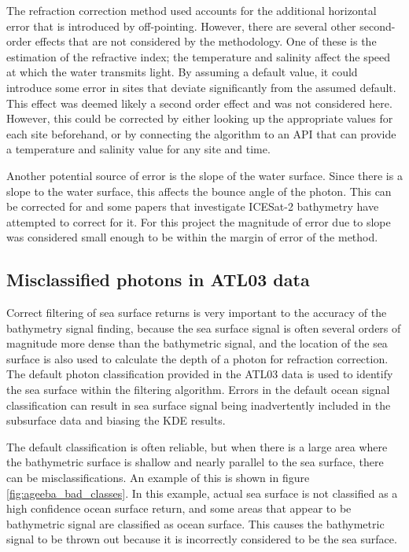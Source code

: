 The refraction correction method used accounts for the additional horizontal error that is introduced by off-pointing. However, there are several other second-order effects that are not considered by the methodology. One of these is the estimation of the refractive index; the temperature and salinity affect the speed at which the water transmits light. By assuming a default value, it could introduce some error in sites that deviate significantly from the assumed default. This effect was deemed likely a second order effect and was not considered here. However, this could be corrected by either looking up the appropriate values for each site beforehand, or by connecting the algorithm to an API that can provide a temperature and salinity value for any site and time.

Another potential source of error is the slope of the water surface. Since there is a slope to the water surface, this affects the bounce angle of the photon. This can be corrected for and some papers that investigate ICESat-2 bathymetry have attempted to correct for it. For this project the magnitude of error due to slope was considered small enough to be within the margin of error of the method.

\subsection{Misclassified photons in ATL03 data}

Correct filtering of sea surface returns is very important to the accuracy of the bathymetry signal finding, because the sea surface signal is often several orders of magnitude more dense than the bathymetric signal, and the location of the sea surface is also used to calculate the depth of a photon for refraction correction. The default photon classification provided in the ATL03 data is used to identify the sea surface within the filtering algorithm. Errors in the default ocean signal classification can result in sea surface signal being inadvertently included in the subsurface data and biasing the KDE results.

The default classification is often reliable, but when there is a large area where the bathymetric surface is shallow and nearly parallel to the sea surface, there can be misclassifications. An example of this is shown in figure \ref{fig:ageeba_bad_classes}. In this example, actual sea surface is not classified as a high confidence ocean surface return, and some areas that appear to be bathymetric signal are classified as ocean surface. This causes the bathymetric signal to be thrown out because it is incorrectly considered to be the sea surface.


